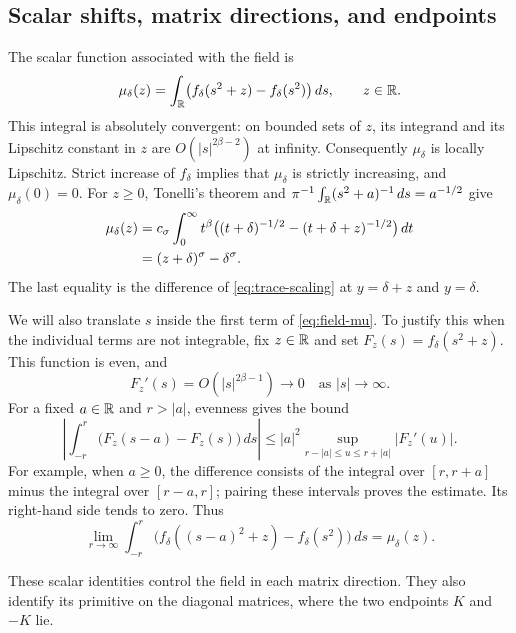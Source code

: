 \subsection{Scalar shifts, matrix directions, and endpoints}

The scalar function associated with the field is
\begin{equation}\label{eq:field-mu}
 \mu_\delta(z)=\int_\mathbb R
       \bigl(f_\delta(s^2+z)-f_\delta(s^2)\bigr)\,ds,
       \qquad z\in\mathbb R.
\end{equation}
This integral is absolutely convergent: on bounded sets of $z$,
its integrand and its Lipschitz constant in $z$ are
$O(|s|^{2\beta-2})$ at infinity.  Consequently $\mu_\delta$ is
locally Lipschitz.  Strict increase of $f_\delta$ implies that
$\mu_\delta$ is strictly increasing, and $\mu_\delta(0)=0$.
For $z\geq0$, Tonelli's theorem and
$\pi^{-1}\int_\mathbb R(s^2+a)^{-1}\,ds=a^{-1/2}$ give
\begin{align}
 \mu_\delta(z)
 &=c_\sigma\int_0^\infty t^\beta
       \bigl((t+\delta)^{-1/2}-(t+\delta+z)^{-1/2}\bigr)\,dt
       \notag\\
 &=(z+\delta)^\sigma-\delta^\sigma.
       \label{eq:field-mu-positive}
\end{align}
The last equality is the difference of
\eqref{eq:trace-scaling} at $y=\delta+z$ and $y=\delta$.

We will also translate $s$ inside the first term of
\eqref{eq:field-mu}.  To justify this when the individual terms
are not integrable, fix $z\in\mathbb R$ and set
$F_z(s)=f_\delta(s^2+z)$.  This function is even, and
\[
 F_z'(s)=O(|s|^{2\beta-1})\longrightarrow0
             \quad\text{as }|s|\longrightarrow\infty.
\]
For a fixed $a\in\mathbb R$ and $r>|a|$, evenness gives the bound
\[
 \left|\int_{-r}^r\bigl(F_z(s-a)-F_z(s)\bigr)\,ds\right|
 \leq |a|^2
       \sup_{r-|a|\leq u\leq r+|a|}|F_z'(u)|.
\]
For example, when $a\geq0$, the difference consists of the integral
over $[r,r+a]$ minus the integral over $[r-a,r]$; pairing these
intervals proves the estimate.  Its right-hand side tends to zero.
Thus
\begin{equation}\label{eq:field-shift}
 \lim_{r\to\infty}\int_{-r}^r
  \bigl(f_\delta((s-a)^2+z)-f_\delta(s^2)\bigr)\,ds
       =\mu_\delta(z).
\end{equation}

These scalar identities control the field in each matrix direction.
They also identify its primitive on the diagonal matrices, where the
two endpoints $K$ and $-K$ lie.

